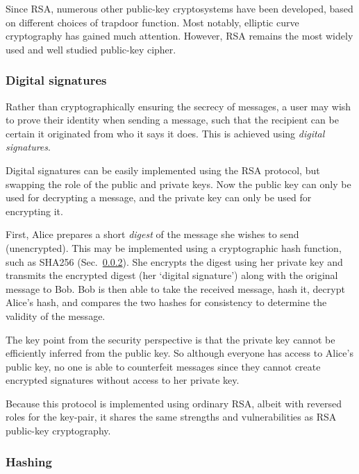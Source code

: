 Since RSA, numerous other public-key cryptosystems have been developed, based on different choices of trapdoor function. Most notably, elliptic curve cryptography has gained much attention. However, RSA remains the most widely used and well studied public-key cipher.

%
%

\subsubsection{Digital signatures} \label{sec:dig_sig} 

Rather than cryptographically ensuring the secrecy of messages, a user may wish to prove their identity when sending a message, such that the recipient can be certain it originated from who it says it does. This is achieved using \textit{digital signatures}.

Digital signatures can be easily implemented using the RSA protocol, but swapping the role of the public and private keys. Now the public key can only be used for decrypting a message, and the private key can only be used for encrypting it.

First, Alice prepares a short \textit{digest} of the message she wishes to send (unencrypted). This may be implemented using a cryptographic hash function, such as SHA256 (Sec.~\ref{sec:hashing}). She encrypts the digest using her private key and transmits the encrypted digest (her `digital signature') along with the original message to Bob. Bob is then able to take the received message, hash it, decrypt Alice's hash, and compares the two hashes for consistency to determine the validity of the message.

The key point from the security perspective is that the private key cannot be efficiently inferred from the public key. So although everyone has access to Alice's public key, no one is able to counterfeit messages since they cannot create encrypted signatures without access to her private key.

Because this protocol is implemented using ordinary RSA, albeit with reversed roles for the key-pair, it shares the same strengths and vulnerabilities as RSA public-key cryptography.

%
%

\subsubsection{Hashing} \label{sec:hashing} 

